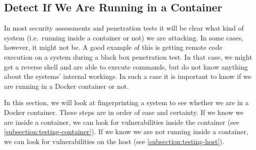 \subsection{Detect If We Are Running in a Container}\label{subsection:detection}
In most security assessments and penetration tests it will be clear what kind of system (i.e.\ running inside a container or not) we are attacking. In some cases, however, it might not be. A good example of this is getting remote code execution on a system during a black box penetration test. In that case, we might get a reverse shell and are able to execute commands, but do not know anything about the systems' internal workings. In such a case it is important to know if we are running in a Docker container or not.

\medskip

In this section, we will look at fingerprinting a system to see whether we are in a Docker container. These steps are in order of ease and certainty. If we know we are inside a container, we can look for vulnerabilities inside the container (see \autoref{subsection:testing-container}). If we know we are not running inside a container, we can look for vulnerabilities on the host (see \autoref{subsection:testing-host}).





